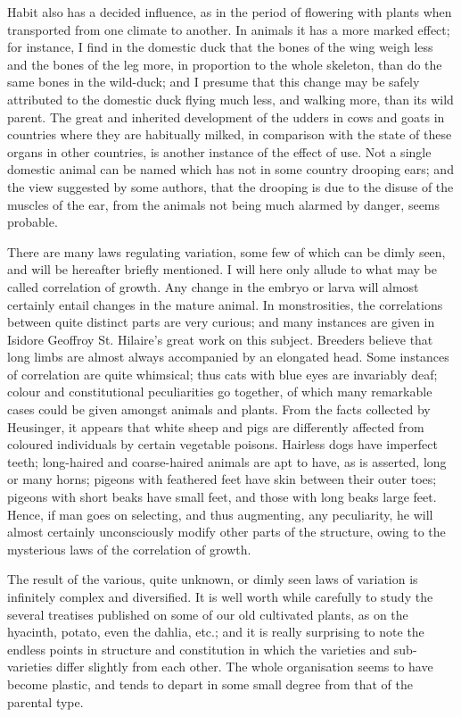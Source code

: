 \documentclass{book}
\begin{document}
Habit also has a decided influence, as in the period of flowering with plants
when transported from one climate to another. In animals it has a more marked
effect; for instance, I find in the domestic duck that the bones of the wing
weigh less and the bones of the leg more, in proportion to the whole skeleton,
than do the same bones in the wild-duck; and I presume that this change may be
safely attributed to the domestic duck flying much less, and walking more, than
its wild parent. The great and inherited development of the udders in cows and
goats in countries where they are habitually milked, in comparison with the
state of these organs in other countries, is another instance of the effect of
use. Not a single domestic animal can be named which has not in some country
drooping ears; and the view suggested by some authors, that the drooping is due
to the disuse of the muscles of the ear, from the animals not being much
alarmed by danger, seems probable.

There are many laws regulating variation, some few of which can be dimly seen,
and will be hereafter briefly mentioned. I will here only allude to what may be
called correlation of growth. Any change in the embryo or larva will almost
certainly entail changes in the mature animal. In monstrosities, the
correlations between quite distinct parts are very curious; and many instances
are given in Isidore Geoffroy St. Hilaire's great work on this subject.
Breeders believe that long limbs are almost always accompanied by an elongated
head. Some instances of correlation are quite whimsical; thus
cats with blue eyes are invariably deaf; colour and constitutional
peculiarities go together, of which many remarkable cases could be given
amongst animals and plants. From the facts collected by Heusinger, it appears
that white sheep and pigs are differently affected from coloured individuals by
certain vegetable poisons. Hairless dogs have imperfect teeth; long-haired and
coarse-haired animals are apt to have, as is asserted, long or many horns;
pigeons with feathered feet have skin between their outer toes; pigeons with
short beaks have small feet, and those with long beaks large feet. Hence, if
man goes on selecting, and thus augmenting, any peculiarity, he will almost
certainly unconsciously modify other parts of the structure, owing to the
mysterious laws of the correlation of growth.

The result of the various, quite unknown, or dimly seen laws of variation is
infinitely complex and diversified. It is well worth while carefully to study
the several treatises published on some of our old cultivated plants, as on the
hyacinth, potato, even the dahlia, etc.; and it is really surprising to note
the endless points in structure and constitution in which the varieties and
sub-varieties differ slightly from each other. The whole organisation seems to
have become plastic, and tends to depart in some small degree from that of the
parental type.
\end{document}

